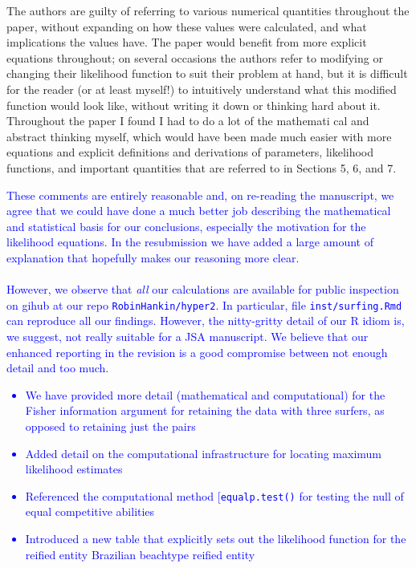 \documentclass[12pt]{article}
\begin{document}
The authors are guilty
of referring to various numerical quantities throughout the paper,
without expanding on how these values were calculated, and what
implications the values have. The paper would benefit from more
explicit equations throughout; on several occasions the authors refer
to modifying or changing their likelihood function to suit their
problem at hand, but it is difficult for the reader (or at least
myself!) to intuitively understand what this modified function would
look like, without writing it down or thinking hard about
it. Throughout the paper I found I had to do a lot of the mathemati
cal and abstract thinking myself, which would have been made much
easier with more equations and explicit definitions and derivations of
parameters, likelihood functions, and important quantities that are
referred to in Sections 5, 6, and 7.


\textcolor{blue}{These comments are entirely reasonable and, on
  re-reading the manuscript, we agree that we could have done a much
  better job describing the mathematical and statistical basis for our
  conclusions, especially the motivation for the likelihood equations.
  In the resubmission we have added a large amount of explanation that
  hopefully makes our reasoning more clear.\\ \\
  However, we observe that {\em all} our calculations are available
  for public inspection on gihub at our repo {\tt RobinHankin/hyper2}.
  In particular, file {\tt inst/surfing.Rmd} can reproduce all our
  findings.  However, the nitty-gritty detail of our R idiom is, we
  suggest, not really suitable for a JSA manuscript.  We believe that
  our enhanced reporting in the revision is a good compromise between
  not enough detail and too much.
  \begin{itemize}
  \item We have provided more detail (mathematical and computational)
    for the Fisher information argument for retaining the data with
    three surfers, as opposed to retaining just the pairs
  \item Added detail on the computational infrastructure for locating
    maximum likelihood estimates
  \item Referenced the computational method [{\tt equalp.test()} for
    testing the null of equal competitive abilities
  \item Introduced a new table that explicitly sets out the likelihood
    function for the reified entity Brazilian beachtype reified entity
  \end{itemize}
}
\end{document}
